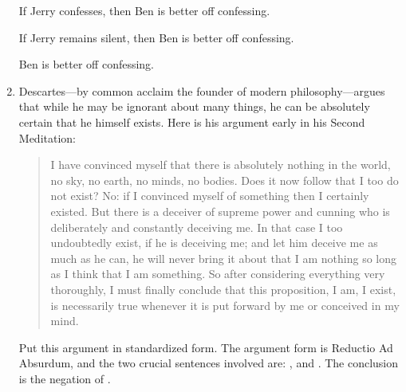 \begin{enumerate}
{\begin{argument*}
  \aitem If Jerry confesses, then Ben is better off confessing.  

  \aitem If Jerry remains silent, then Ben is better off confessing.  

  \aergo Ben is better off confessing. 
 \end{argument*}
 }

\item Descartes---by common acclaim the founder of modern philosophy---argues 
 that while he may be ignorant about many things, he can be absolutely certain 
 that he himself exists. Here is his argument early in his Second Meditation:

 \begin{quote}
  I have convinced myself that there is absolutely nothing in the world, no sky, 
  no earth, no minds, no bodies. Does it now follow that I too do not exist? No: 
  if I convinced myself of something then I certainly existed. But there is a 
  deceiver of supreme power and cunning who is deliberately and constantly 
  deceiving me. In that case I too undoubtedly exist, if he is deceiving me; and 
  let him deceive me as much as he can, he will never bring it about that I am 
  nothing so long as I think that I am something. So after considering 
  everything very thoroughly, I must finally conclude that this proposition, I 
  am, I exist, is necessarily true whenever it is put forward by me or conceived 
  in my mind.
 \end{quote}

 Put this argument in standardized form. The argument form is Reductio Ad 
 Absurdum, and the two crucial sentences involved are: , and . The conclusion is the negation of 
 .



\end{enumerate}


